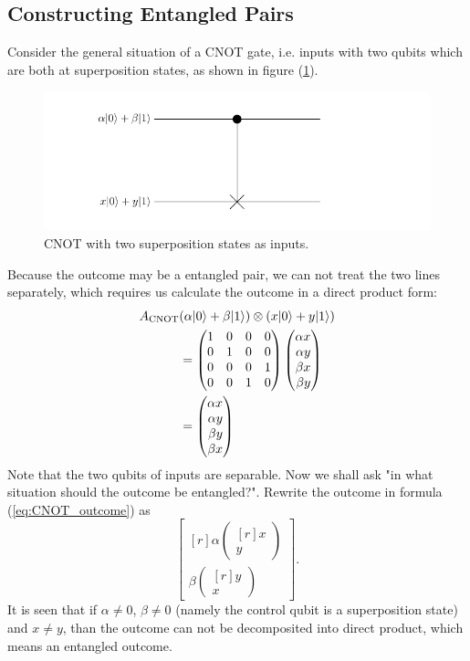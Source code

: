 	\subsection{Constructing Entangled Pairs}
		\label{subsec:CstEP}
		Consider the general situation of a CNOT gate, i.e. inputs 
		with two qubits which are both at superposition states, as shown in figure (\ref{img:CNOTGeneral}).
		\begin{figure}
		\centering
		\includegraphics[scale=0.7]{img/CNOT-3.pdf}
		\caption{CNOT with two superposition states as inputs.}
		\label{img:CNOTGeneral}
		\end{figure}
		Because the outcome may be a entangled pair, we can not treat the two lines separately, which requires us calculate the outcome in a direct product form:
		\begin{equation}
			\begin{split}
			A_{\text{CNOT}}&(\alpha \bra{0}+\beta\bra{1})\otimes (x\bra{0}+y\bra{1}) \\
			&= \CNOT \begin{pmatrix*}[r] \alpha x\\ \alpha y \\ \beta x \\ \beta y \end{pmatrix*}\\
			&= \begin{pmatrix*}[r] \alpha x\\ \alpha y \\ \beta y \\ \beta x \end{pmatrix*}
			\end{split}
			\label{eq:CNOT_outcome}
		\end{equation}
		Note that the two qubits of inputs are separable. 
		Now we shall ask "in what situation should the outcome be entangled?". Rewrite 
		the outcome in formula (\ref{eq:CNOT_outcome}) as 
		\begin{equation}
		\begin{bmatrix*}[r] \alpha \begin{pmatrix*}[r] x \\ y \end{pmatrix*}\\
							\beta \begin{pmatrix*}[r] y \\ x \end{pmatrix*} 
							\end{bmatrix*}.
		\end{equation}
		It is seen that if $\alpha \neq 0$, $\beta \neq 0$ (namely the control qubit is 
		a superposition state) and $x \neq y$, than the outcome can not be decomposited
		into direct product, which means an entangled outcome.

